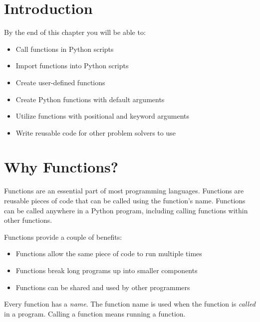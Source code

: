 \documentclass{book}
\begin{document}
    
        \section{Introduction}\label{introduction}
    




    
        By the end of this chapter you will be able to:

\begin{itemize}
\item
  Call functions in Python scripts
\item
  Import functions into Python scripts
\item
  Create user-defined functions
\item
  Create Python functions with default arguments
\item
  Utilize functions with positional and keyword arguments
\item
  Write reusable code for other problem solvers to use
\end{itemize}
        \newpage



    




    
        \section{Why Functions?}\label{why-functions}
    




    
        Functions are an essential part of most programming languages. Functions
are reusable pieces of code that can be called using the function's
name. Functions can be called anywhere in a Python program, including
calling functions within other functions.

Functions provide a couple of benefits:

\begin{itemize}
\item
  Functions allow the same piece of code to run multiple times
\item
  Functions break long programs up into smaller components
\item
  Functions can be shared and used by other programmers
\end{itemize}

Every function has a \emph{name}. The function name is used when the
function is \emph{called} in a program. Calling a function means running
a function.
\end{document}
